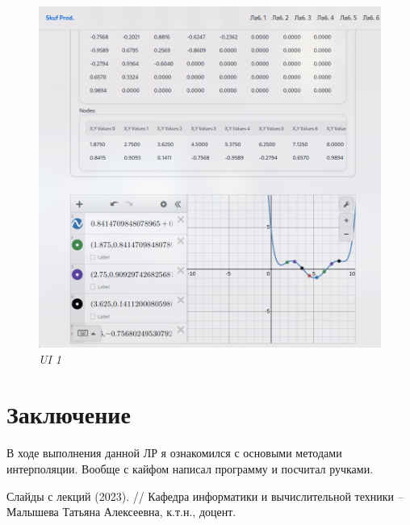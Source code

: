 \documentclass{article}
\begin{document}
                   \begin{figure}[H] 
                        \begin{center}  
                              \includegraphics[scale=0.4]{ui2.png}
                              \caption{\small \sl {UI  1}}  
                        \end{center}  
                  \end{figure}      
            
\section{Заключение}
      В ходе выполнения данной ЛР я ознакомился с основыми методами интерполяции. Вообще с кайфом написал программу и посчитал ручками.

\begin{thebibliography}{9}
    Слайды с лекций (2023). // Кафедра информатики и вычислительной техники -- Малышева Татьяна Алексеевна, к.т.н., доцент.
\end{thebibliography} 
\end{document}
